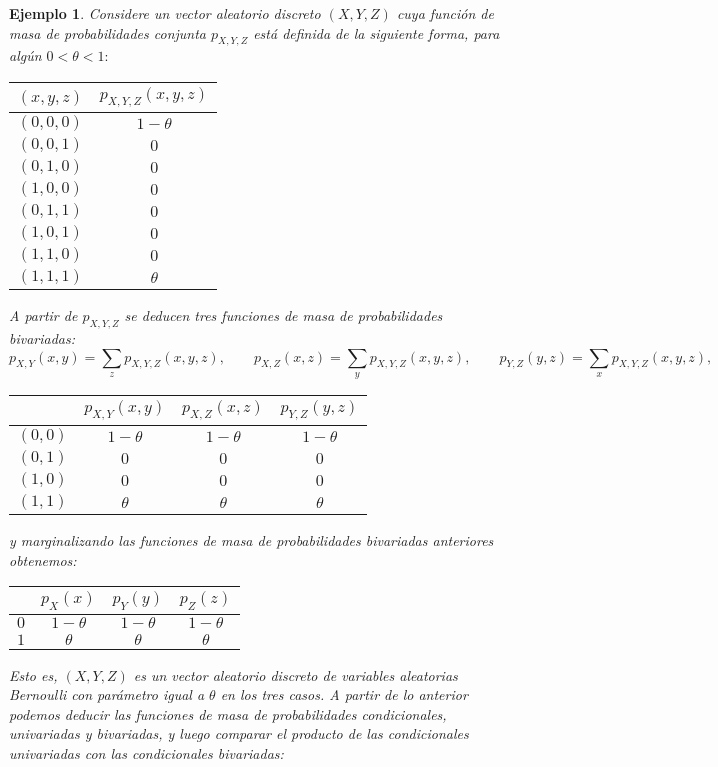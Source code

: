 \documentclass[spanish,10pt,letterpaper]{article}
\newtheorem{ejem}{Ejemplo}
\begin{document}
\begin{ejem}\label{ej:indepcondNoindep}
    Considere un vector aleatorio discreto $(X,Y,Z)$ cuya función de masa de probabilidades conjunta $p_{X,Y,Z}$ está definida de la siguiente forma, para algún $0<\theta<1:$
    \begin{center}
        \begin{tabular}{|c|c|} \hline
		  $(x,y,z)$ & $p_{X,Y,Z}(x,y,z)$  \\ \hline\hline  
		  $(0,0,0)$ & $1-\theta$  \\
		  $(0,0,1)$ & $0$ \\ 
		  $(0,1,0)$ & $0$ \\ 
		  $(1,0,0)$ & $0$ \\
		  $(0,1,1)$ & $0$ \\
		  $(1,0,1)$ & $0$ \\
		  $(1,1,0)$ & $0$ \\
		  $(1,1,1)$ & $\theta$ \\ \hline 
        \end{tabular}
   \end{center}
   A partir de $p_{X,Y,Z}$ se deducen tres funciones de masa de probabilidades bivariadas: 
   $$p_{X,Y}(x,y)=\sum_{z}p_{X,Y,Z}(x,y,z),\qquad p_{X,Z}(x,z)=\sum_{y}p_{X,Y,Z}(x,y,z),\qquad p_{Y,Z}(y,z)=\sum_{x}p_{X,Y,Z}(x,y,z),$$
   
   \begin{center}
        \begin{tabular}{|c|c|c|c|} \hline
            { } & $p_{X,Y}(x,y)$ & $p_{X,Z}(x,z)$ & $p_{Y,Z}(y,z)$ \\ \hline\hline
            $(0,0)$ & $1-\theta$ & $1-\theta$ & $1-\theta$ \\
            $(0,1)$ & $0$ & $0$ & $0$ \\
            $(1,0)$ & $0$ & $0$ & $0$ \\
            $(1,1)$ & $\theta$ & $\theta$ & $\theta$ \\ \hline
        \end{tabular}
   \end{center}
   y marginalizando las funciones de masa de probabilidades bivariadas anteriores obtenemos:

   \begin{center}
       \begin{tabular}{|c|c|c|c|} \hline 
            { } & $p_X(x)$ & $p_Y(y)$ & $p_Z(z)$ \\ \hline\hline
            $0$ &  $1-\theta$   &  $1-\theta$   &  $1-\theta$  \\
            $1$ &  $\theta$   &  $\theta$   &  $\theta$  \\ \hline 
       \end{tabular}
   \end{center}
   Esto es, $(X,Y,Z)$ es un vector aleatorio discreto de variables aleatorias Bernoulli con parámetro igual a $\theta$ en los tres casos. A partir de lo anterior podemos deducir las funciones de masa de probabilidades condicionales, univariadas y bivariadas, y luego comparar el producto de las condicionales univariadas con las condicionales bivariadas:


\end{ejem}
\end{document}
